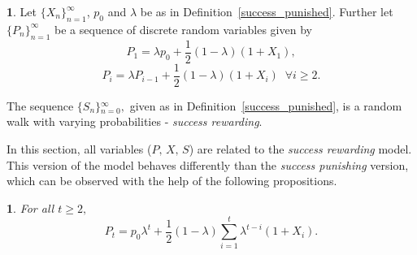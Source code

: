 \documentclass{amsart}
\theoremstyle{definition}
\newtheorem{defn}[thm]{\protect\definitionname}
\theoremstyle{plain}
\newtheorem{prop}[thm]{\protect\propositionname}
\theoremstyle{plain}
\theoremstyle{plain}
\numberwithin{equation}{section}
\providecommand{\definitionname}{Definition}
\providecommand{\propositionname}{Proposition}
\begin{document}
    \begin{defn}
        \label{succes_rewarded}Let ${\{X_{n}\}}_{n=1}^{\infty}$, $p_{0}$
        and $\lambda$ be as in Definition~\ref{success_punished}.
        Further
        let ${\{P_{n}\}}_{n=1}^{\infty}$ be a sequence of discrete random
        variables given by
        \begin{equation}
            P_{1}=\lambda p_{0}+\frac{1}{2}(1-\lambda)(1+X_{1}),\label{eq:P1_def-reward}
        \end{equation}
        \begin{equation}
            P_{i}=\lambda P_{i-1}+\frac{1}{2}(1-\lambda)(1+X_{i})\;\;\forall i\geq2.\label{eq:Pi_def-reward}
        \end{equation}

        The sequence ${\{S_{n}\}}{}_{n=0}^{\infty},$ given as in Definition~\ref{success_punished}, is a random walk with varying probabilities - \emph{success
        rewarding}.
    \end{defn}
    In this section, all variables ($P,\,X,\,S$) are related to the
    \emph{success rewarding} model.
    This version of the model behaves differently
    than the \emph{success punishing} version, which can be observed with
    the help of the following propositions.

    \begin{prop}
        For all $t\ge 2,$
        \begin{equation}
            P_{t}=p_{0}\lambda^{t}+\frac{1}{2}(1-\lambda)\sum_{i=1}^{t}\lambda^{t-i}(1+X_{i}).\label{eq:propSuccess1}
        \end{equation}
    \end{prop}
\end{document}
